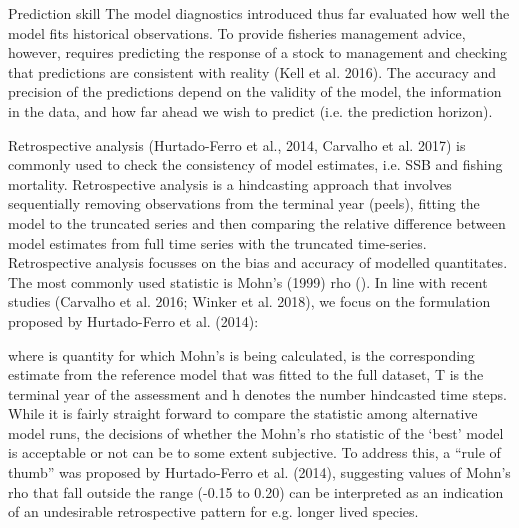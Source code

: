 

\iffalse
Prediction skill
The model diagnostics introduced thus far evaluated how well the model fits historical observations. To provide fisheries management advice, however, requires predicting the response of a stock to management and checking that predictions are consistent with reality (Kell et al. 2016). The accuracy and precision of the predictions depend on the validity of the model, the information in the data, and how far ahead we wish to predict (i.e. the prediction horizon). 

Retrospective analysis  (Hurtado-Ferro et al., 2014, Carvalho et al. 2017) is commonly used to check the consistency of model estimates, i.e. SSB and fishing mortality. Retrospective analysis is a hindcasting approach that involves sequentially removing  observations from the terminal year (peels), fitting the model to the truncated series and then comparing the relative difference between model estimates from full time series with the truncated time-series. Retrospective analysis focusses on the bias and accuracy of modelled quantitates. The most commonly used statistic is Mohn’s (1999) rho (). In line with recent studies (Carvalho et al. 2016; Winker et al. 2018), we focus on the formulation proposed by Hurtado-Ferro et al. (2014): 

where  is quantity for which Mohn’s is being calculated,  is the corresponding estimate from the reference model that was fitted to the full dataset, T is the terminal year of the assessment and h denotes the number hindcasted time steps. While it is fairly straight forward to compare the  statistic among alternative model runs, the decisions of whether the Mohn’s rho statistic of the ‘best’ model is acceptable or not can be to some extent subjective. To address this, a “rule of thumb” was proposed by Hurtado-Ferro et al. (2014), suggesting values of Mohn’s rho that fall outside the range (-0.15 to 0.20) can be interpreted as an indication of an undesirable retrospective pattern for e.g. longer lived species.

